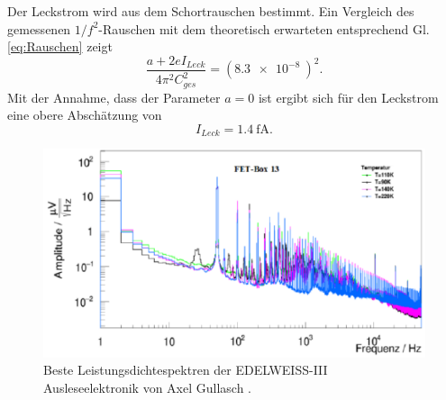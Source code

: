 Der Leckstrom wird aus dem Schortrauschen bestimmt.
Ein Vergleich des gemessenen $1/f^2$-Rauschen mit dem theoretisch erwarteten entsprechend Gl. \ref{eq:Rauschen} zeigt
\begin{equation}
\frac{a + 2eI_{Leck}}{4\pi^2C^2_{ges}} = (\SI{8.3e-8}{})^2.
\end{equation}
Mit der Annahme, dass der Parameter $a=0$ ist ergibt sich für den Leckstrom eine obere Abschätzung von
\begin{equation}
I_{Leck} = \SI{1.4}{\femto\ampere}.
\end{equation}

\begin{figure}[!b]
\begin{center}
\includegraphics[width=\textwidth]{./fig/Rauschen/GullaschRauschen.pdf}
\vspace{-0.5cm}
\caption{Beste Leistungsdichtespektren der EDELWEISS-III Ausleseelektronik von Axel Gullasch \cite{Gullasch2015}.}
\label{fig:EDW}
\end{center}
\end{figure}